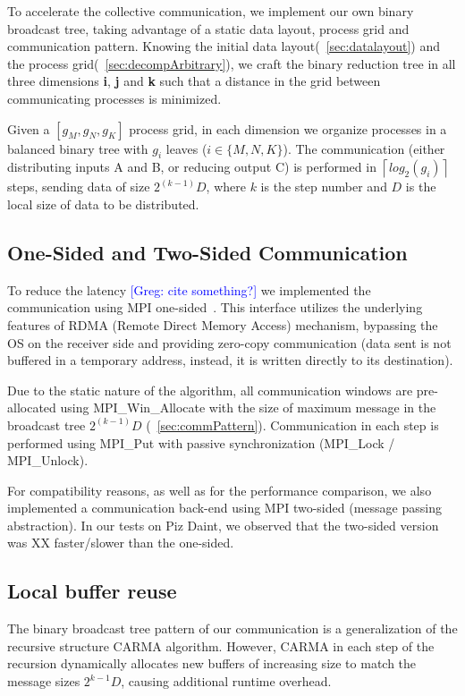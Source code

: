 \documentclass[sigplan,review,anonymous]{acmart}\settopmatter{printfolios=true,printccs=false,printacmref=false}
\newcommand\greg[1]{\textcolor{blue}{[Greg: #1]}}
\begin{document}
To accelerate the collective communication, we implement our own binary 
broadcast 
tree, taking advantage of a static data layout, process grid and communication 
pattern.
 Knowing the initial data 
layout(~\cref{sec:datalayout}) and the process 
grid(~\cref{sec:decompArbitrary}), we craft the binary reduction tree 
in all three dimensions \textbf{i}, \textbf{j} and \textbf{k} such that a 
distance in the grid between communicating processes is minimized. 

Given a $[g_M, g_N, g_K]$ process grid, in each dimension we organize processes 
in a balanced binary tree with $g_i$ leaves ($i \in \{M,N,K\}$). The 
communication 
(either distributing inputs A and B, or reducing output C) is performed in 
$\left \lceil{log_2(g_i)} \right \rceil$ steps, sending data of size $2^(k-1) 
D$, where $k$ is the step 
number and $D$ is the local size of data to be distributed.

\subsection{One-Sided and Two-Sided Communication}
\label{sec:rdma}
To reduce the latency \greg{cite something?} we implemented the communication 
using MPI one-sided~\cite{mpi3-rma-overview}. This interface utilizes the 
underlying features of RDMA (Remote Direct Memory Access) mechanism, bypassing 
the OS on the receiver side and providing zero-copy communication (data sent is 
not buffered in a temporary address, instead, it is written directly to its 
destination).

Due to the static nature of the algorithm, all communication windows are 
pre-allocated using MPI\_Win\_Allocate with the size of maximum message in the 
broadcast tree $2^(k-1) D$ (~\cref{sec:commPattern}). Communication in each 
step is performed using MPI\_Put with passive synchronization (MPI\_Lock / 
MPI\_Unlock).

For compatibility reasons, as well as for the performance comparison, we also 
implemented a communication back-end using MPI two-sided (message passing 
abstraction). In our tests on Piz Daint, we observed that the two-sided version 
was XX faster/slower than the one-sided.


\subsection{Local buffer reuse}
\label{sec:bufferReuse}
The binary broadcast tree pattern of our communication is a generalization of 
the recursive structure CARMA algorithm. However, CARMA in each step of the 
recursion dynamically allocates new buffers of increasing size to match the 
message sizes $2^{k-1} D$, causing additional runtime overhead.
\end{document}
